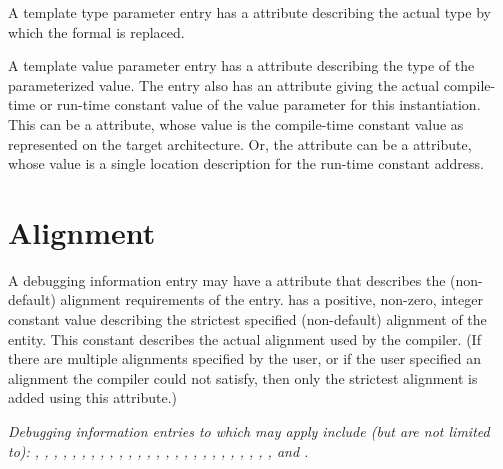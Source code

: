 A
template type parameter entry has a
\DWATtype{} attribute
describing the actual type by which the formal is replaced.

A template value parameter entry has a \DWATtype{} attribute 
describing the type of the parameterized value.
The entry also has an attribute giving the 
actual compile-time or run-time constant value 
of the value parameter for this instantiation.
This can be a 
\DWATconstvalue{} 
attribute, whose
value is the compile-time constant value as represented 
on the target architecture. 
Or, the attribute can be a \DWATlocation{} attribute, whose value is a 
single location description for the run-time constant address.

\section{Alignment}
\label{chap:alignment}
A debugging information entry may have a 
\DWATalignment{} attribute
that describes the (non-default) alignment requirements of the entry.
\DWATalignment{} has a positive, non-zero, integer constant value
describing the strictest specified (non-default) alignment of the entity. 
This constant describes the actual alignment used by the compiler.
(If there are multiple alignments specified by the user, or if the 
user specified an alignment the compiler could not satisfy, then 
only the strictest alignment is added using this attribute.)

\textit{Debugging information entries to which \DWATalignment{} may 
apply include (but are not limited to):
\DWTAGarraytype, \DWTAGatomictype, \DWTAGbasetype, 
\DWTAGclasstype, 
\DWTAGcoarraytype, \DWTAGconsttype, \DWTAGdynamictype,
\DWTAGenumerationtype, \DWTAGfiletype, \DWTAGinterfacetype,
\DWTAGpackedtype, \DWTAGpointertype, \DWTAGptrtomembertype,
\DWTAGreferencetype, \DWTAGrestricttype, \DWTAGrvaluereferencetype,
\DWTAGsettype, \DWTAGsharedtype, \DWTAGstringtype, \DWTAGstructuretype,
\DWTAGsubprogram, \DWTAGsubrangetype, \DWTAGsubroutinetype,
\DWTAGthrowntype, \DWTAGtypedef, \DWTAGuniontype, and \DWTAGvariable.}



